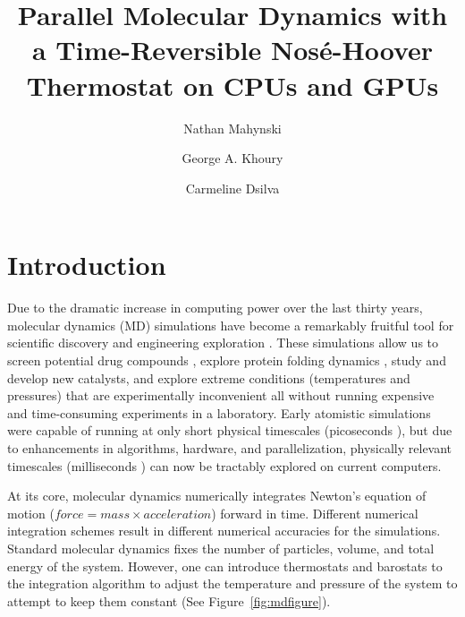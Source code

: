 \usepackage{pslatex,multicol,verbatim,wrapfig,pdfpages,url}

\title{Parallel Molecular Dynamics with a Time-Reversible Nos\'{e}-Hoover Thermostat on CPUs and GPUs}

\author{Nathan Mahynski \and George A. Khoury \and Carmeline Dsilva}




\maketitle

\section{Introduction}

Due to the dramatic increase in computing power over the last thirty years, molecular dynamics (MD) simulations have become a remarkably fruitful tool for scientific discovery and engineering exploration \cite{Karplus2002,Levitt2001}.
%
These simulations allow us to screen potential drug compounds \cite{Jorgensen2004}, explore protein folding dynamics \cite{Duan1998,Shaw2010,Piana2013,Lindorff-Larsen2011}, study \cite{Boero1998} and develop \cite{Zipoli2010} new catalysts, and explore extreme conditions (temperatures and pressures) that are experimentally inconvenient all without running expensive and time-consuming experiments in a laboratory.
%
Early atomistic simulations were capable of running at only short physical timescales (picoseconds \cite{Karplus1979}), but due to enhancements in algorithms, hardware, and parallelization, physically relevant timescales (milliseconds \cite{Kohlhoff2014}) can now be tractably explored on current computers.

At its core, molecular dynamics numerically integrates Newton's equation of motion ($force = mass \times acceleration$) forward in time.
%
Different numerical integration schemes result in different numerical accuracies for the simulations.
%
Standard molecular dynamics fixes the number of particles, volume, and total energy of the system.
%
However, one can introduce thermostats and barostats to the integration algorithm to adjust the temperature and pressure of the system to attempt to keep them constant (See Figure~\ref{fig:mdfigure}).

